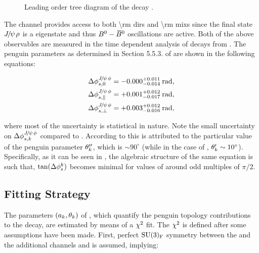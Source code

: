 \begin{figure}[h]
  \centering
  \scalebox{0.9}{\sffamily }
  \caption{Leading order tree diagram of the decay \BdJpsiRho.}
  \label{bs2jpsirho_diagram}
\end{figure}

The \BdJpsiRho channel provides access to both \Acp{\rm dir} and \Acp{\rm mix} since the final state ${J\mskip -3mu/\mskip -2mu\psi\mskip 2mu}\rho$ is
a \CP eigenstate and thus $B^0-\kern 0.18em\overline{\kern -0.18em B}{}^0$ oscillations are active. Both of the above observables are measured in the
time dependent analysis of \BdJpsipipi decays from \lhcb \cite{Aaij:2014vda}. The penguin parameters as determined
in Section 5.5.3. of \cite{DeBruyn-thesis} are shown in the following equations:

\begin{subequations}
  \label{delta_phis_jpsirho}
  \begin{align}
    \Delta\phi^{{J\mskip -3mu/\mskip -2mu\psi\mskip 2mu}\phi}_{s,{0}}         & = -0.000^{+0.011}_{-0.014}\:\text{rad},\\
    \Delta\phi^{{J\mskip -3mu/\mskip -2mu\psi\mskip 2mu}\phi}_{s,{\parallel}} & = +0.001^{+0.012}_{-0.017}\:\text{rad},\\
    \Delta\phi^{{J\mskip -3mu/\mskip -2mu\psi\mskip 2mu}\phi}_{s,{\perp}}     & = +0.003^{+0.012}_{-0.016}\:\text{rad},
  \end{align}
\end{subequations}

\noindent where most of the uncertainty is statistical in nature. Note the small uncertainty on
$\Delta\phi^{{J\mskip -3mu/\mskip -2mu\psi\mskip 2mu}\phi}_{s,{k}}$ compared to . According to \cite{DeBruyn:2014oga,DeBruyn-thesis}
this is attributed to the particular value of the penguin parameter $\theta_k''$, which is
$\sim 90^\circ$ (while in the case of \BsJpsiKst, $\theta_k' \sim 10^\circ$).
Specifically, as it can be seen in , the algebraic structure of the
same equation is such that, $\tan(\Delta\phi_{s}^k)$ becomes minimal for values of \thkPeng{}
around odd multiples of $\pi/2$.

\subsection{Fitting Strategy}
\label{penguin_chi2_fit}

The parameters $(a_k,\theta_k)$ of , which quantify the penguin topology contributions
to the \BsJpsiPhi decay, are estimated by means of a $\chi^2$ fit. The $\chi^2$ is defined after some assumptions have
been made. First, perfect $\mathrm{SU}(3)_{\rm F}$ symmetry between the \BsJpsiPhi and the additional channels \BsJpsiKst
and \BdJpsiRho is assumed, implying:


